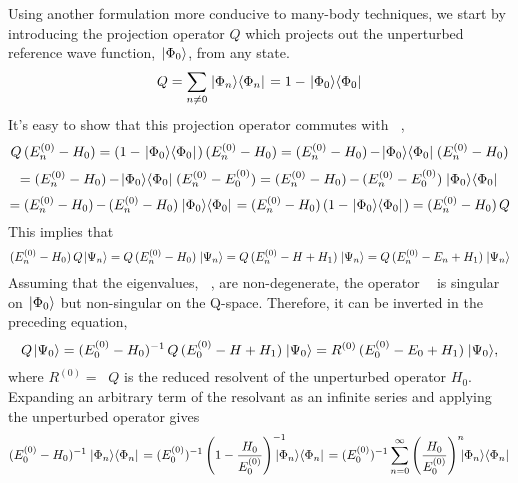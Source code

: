 \documentclass[thesis.tex]{subfiles}
\begin{document}
Using another formulation more conducive to many-body techniques, we start by introducing the projection operator $Q$ which projects out the unperturbed reference wave function, $\hspace{1pt}| \Phi_{0} \rangle$, from any state.
\begin{equation}
Q=\sum_{n\neq 0}\hspace{1pt}| \Phi_{n} \rangle\langle \Phi_{n} |\hspace{1pt}=1-\hspace{1pt}| \Phi_{0} \rangle\langle \Phi_{0} |\hspace{1pt}
\end{equation}
It's easy to show that this projection operator commutes with $\mathop{(E^{(0)}_{n}-H_{0})}$,
\begin{equation}
Q\mathop{(E^{(0)}_{n}-H_{0})}=\mathop{(1-\hspace{1pt}| \Phi_{0} \rangle\langle \Phi_{0} |\hspace{1pt})}\mathop{(E^{(0)}_{n}-H_{0})}=\mathop{(E^{(0)}_{n}-H_{0})}-\hspace{1pt}| \Phi_{0} \rangle\langle \Phi_{0} |\hspace{1pt}\mathop{(E^{(0)}_{n}-H_{0})}
\end{equation}
\begin{equation}
=\mathop{(E^{(0)}_{n}-H_{0})}-\hspace{1pt}| \Phi_{0} \rangle\langle \Phi_{0} |\hspace{1pt}\mathop{(E^{(0)}_{n}-E^{(0)}_{0})}=\mathop{(E^{(0)}_{n}-H_{0})}-\mathop{(E^{(0)}_{n}-E^{(0)}_{0})}\hspace{1pt}| \Phi_{0} \rangle\langle \Phi_{0} |\hspace{1pt}
\end{equation}
\begin{equation}
=\mathop{(E^{(0)}_{n}-H_{0})}-\mathop{(E^{(0)}_{n}-H_{0})}\hspace{1pt}| \Phi_{0} \rangle\langle \Phi_{0} |\hspace{1pt}=\mathop{(E^{(0)}_{n}-H_{0})}\mathop{(1-\hspace{1pt}| \Phi_{0} \rangle\langle \Phi_{0} |\hspace{1pt})}=\mathop{(E^{(0)}_{n}-H_{0})}Q
\end{equation}
This implies that
\begin{equation}
\mathop{(E^{(0)}_{n}-H_{0})}Q\hspace{1pt}| \Psi_{n} \rangle=Q\mathop{(E^{(0)}_{n}-H_{0})}\hspace{1pt}| \Psi_{n} \rangle=Q\mathop{(E^{(0)}_{n}-H+H_{1})}\hspace{1pt}| \Psi_{n} \rangle=Q\mathop{(E^{(0)}_{n}-E_{n}+H_{1})}\hspace{1pt}| \Psi_{n} \rangle
\end{equation}
Assuming that the eigenvalues, $\mathop{E^{(0)}_{n}}$, are non-degenerate, the operator $\mathop{(E^{(0)}_{0}-H_{0})}$ is singular on $\hspace{1pt}| \Phi_{0} \rangle$ but non-singular on the Q-space. Therefore, it can be inverted in the preceding equation,
\begin{equation}
Q\hspace{1pt}| \Psi_{0} \rangle=\mathop{(E^{(0)}_{0}-H_{0})^{-1}}Q\mathop{(E^{(0)}_{0}-H+H_{1})}\hspace{1pt}| \Psi_{0} \rangle=R^{(0)}\mathop{(E^{(0)}_{0}-E_{0}+H_{1})}\hspace{1pt}| \Psi_{0} \rangle,
\end{equation}
where $R^{(0)}=\mathop{(E^{(0)}_{0}-H_{0})^{-1}}Q$ is the reduced resolvent of the unperturbed operator $H_{0}$. Expanding an arbitrary term of the resolvant as an infinite series and applying the unperturbed operator gives
\begin{equation}
\mathop{(E^{(0)}_{0}-H_{0})^{-1}}\ket{\Phi_{n}}\bra{\Phi_{n}}=\mathop{(E^{(0)}_{0})^{-1}}\mathop{\left(1-\frac{H_{0}}{E^{(0)}_{0}}\right)^{-1}}\hspace{-4mm}\ket{\Phi_{n}}\bra{\Phi_{n}}=\mathop{(E^{(0)}_{0})^{-1}}\sum_{n=0}^{\infty}\mathop{\left(\frac{H_{0}}{E^{(0)}_{0}}\right)^{n}}\hspace{-2mm}\ket{\Phi_{n}}\bra{\Phi_{n}}
\end{equation}
\end{document}
